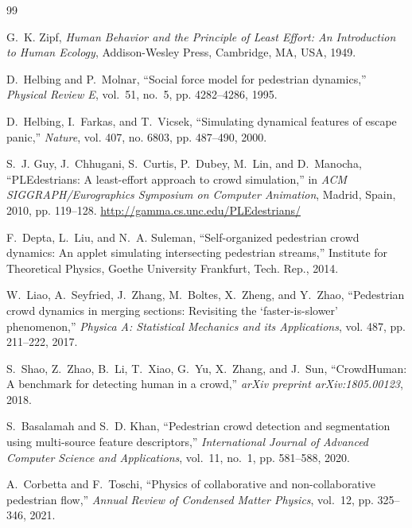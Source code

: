 \documentclass[12pt,a4paper]{article}
\begin{document}
\begin{thebibliography}{99}
\fontsize{10pt}{12pt}\selectfont

G.~K. Zipf, \emph{Human Behavior and the Principle of Least Effort: An Introduction to Human Ecology}, Addison-Wesley Press, Cambridge, MA, USA, 1949.

D.~Helbing and P.~Molnar, ``Social force model for pedestrian dynamics,'' \emph{Physical Review E}, vol.~51, no.~5, pp. 4282--4286, 1995.

D.~Helbing, I.~Farkas, and T.~Vicsek, ``Simulating dynamical features of escape panic,'' \emph{Nature}, vol. 407, no. 6803, pp. 487--490, 2000.

S.~J. Guy, J.~Chhugani, S.~Curtis, P.~Dubey, M.~Lin, and D.~Manocha, ``PLEdestrians: A least-effort approach to crowd simulation,'' in \emph{ACM SIGGRAPH/Eurographics Symposium on Computer Animation}, Madrid, Spain, 2010, pp. 119--128. \url{http://gamma.cs.unc.edu/PLEdestrians/}

F.~Depta, L.~Liu, and N.~A. Suleman, ``Self-organized pedestrian crowd dynamics: An applet simulating intersecting pedestrian streams,'' Institute for Theoretical Physics, Goethe University Frankfurt, Tech. Rep., 2014.

W.~Liao, A.~Seyfried, J.~Zhang, M.~Boltes, X.~Zheng, and Y.~Zhao, ``Pedestrian crowd dynamics in merging sections: Revisiting the `faster-is-slower' phenomenon,'' \emph{Physica A: Statistical Mechanics and its Applications}, vol. 487, pp. 211--222, 2017.

S.~Shao, Z.~Zhao, B.~Li, T.~Xiao, G.~Yu, X.~Zhang, and J.~Sun, ``CrowdHuman: A benchmark for detecting human in a crowd,'' \emph{arXiv preprint arXiv:1805.00123}, 2018.

S.~Basalamah and S.~D. Khan, ``Pedestrian crowd detection and segmentation using multi-source feature descriptors,'' \emph{International Journal of Advanced Computer Science and Applications}, vol.~11, no.~1, pp. 581--588, 2020.

A.~Corbetta and F.~Toschi, ``Physics of collaborative and non-collaborative pedestrian flow,'' \emph{Annual Review of Condensed Matter Physics}, vol.~12, pp. 325--346, 2021.


\end{thebibliography}
\end{document}

